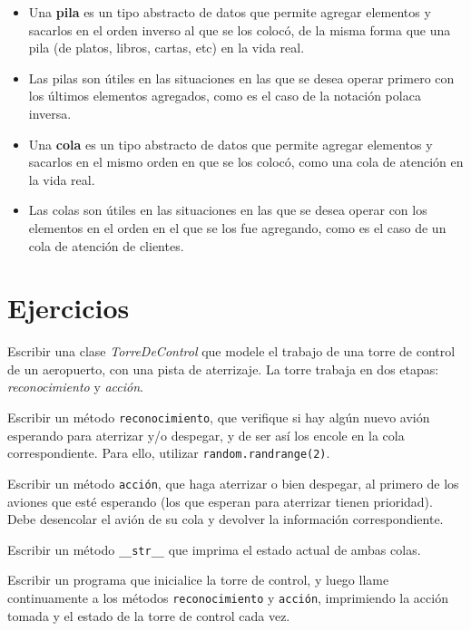 \begin{itemize}

\item Una {\bf pila} es un tipo abstracto de datos que permite agregar
elementos y sacarlos en el orden inverso al que se los colocó, de la misma
forma que una pila (de platos, libros, cartas, etc) en la vida real.

\item Las pilas son útiles en las situaciones en las que se desea operar
primero con los últimos elementos agregados, como es el caso de la notación
polaca inversa.

\item Una {\bf cola} es un tipo abstracto de datos que permite agregar
elementos y sacarlos en el mismo orden en que se los colocó, como una cola
de atención en la vida real.

\item Las colas son útiles en las situaciones en las que se desea operar
con los elementos en el orden en el que se los fue agregando, como es el
caso de un cola de atención de clientes.

\end{itemize}

\newpage
\section{Ejercicios}

\begin{ejercicio}
Escribir una clase {\it TorreDeControl} que modele el trabajo de una torre
de control de un aeropuerto, con una pista de aterrizaje.  La torre trabaja
en dos etapas: {\it reconocimiento} y {\it acción}.
\begin{partes}
    \item Escribir un método \verb!reconocimiento!, que verifique si hay algún
nuevo avión esperando para aterrizar y/o despegar, y de ser así los encole
en la cola correspondiente. Para ello, utilizar \verb!random.randrange(2)!.
    \item Escribir un método \verb!acción!, que haga aterrizar o
bien despegar, al primero de los aviones que esté esperando (los que
esperan para aterrizar tienen prioridad). Debe desencolar el avión de su
cola y devolver la información correspondiente.
    \item Escribir un método \verb!__str__! que imprima el estado actual de
ambas colas.
    \item Escribir un programa que inicialice la torre de control, y luego llame
continuamente a los métodos \verb!reconocimiento! y \verb!acción!,
imprimiendo la acción tomada y el estado de la torre de control cada vez.
\end{partes}
\end{ejercicio}


